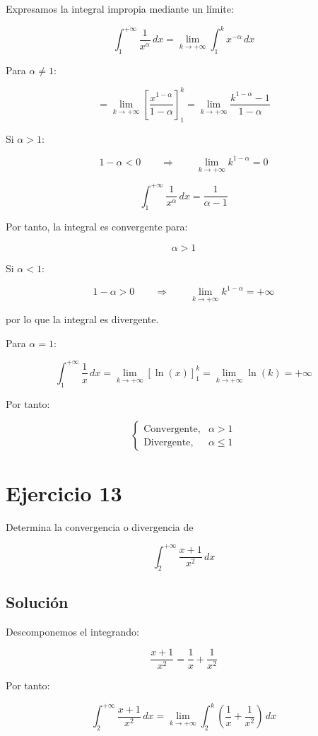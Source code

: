 \documentclass[fleqn]{article}
\begin{document}
	Expresamos la integral impropia mediante un límite:

	\[
	\int_1^{+\infty}\frac{1}{x^\alpha}\,dx
	=
	\lim_{k\to+\infty}
	\int_1^k x^{-\alpha}\,dx
	\]

	Para $\alpha\neq1$:

	\[
	=
	\lim_{k\to+\infty}
	\left[
	\frac{x^{1-\alpha}}{1-\alpha}
	\right]_1^k
	=
	\lim_{k\to+\infty}
	\frac{k^{1-\alpha}-1}{1-\alpha}
	\]

	Si $\alpha>1$:

	\[
	1-\alpha<0
	\qquad\Longrightarrow\qquad
	\lim_{k\to+\infty}k^{1-\alpha}=0
	\]

	\[
	\int_1^{+\infty}\frac{1}{x^\alpha}\,dx
	=
	\frac{1}{\alpha-1}
	\]

	Por tanto, la integral es convergente para:

	\[
	\boxed{\alpha>1}
	\]

	Si $\alpha<1$:

	\[
	1-\alpha>0
	\qquad\Longrightarrow\qquad
	\lim_{k\to+\infty}k^{1-\alpha}=+\infty
	\]

	por lo que la integral es divergente.

	Para $\alpha=1$:

	\[
	\int_1^{+\infty}\frac{1}{x}\,dx
	=
	\lim_{k\to+\infty}
	\left[\ln(x)\right]_1^k
	=
	\lim_{k\to+\infty}\ln(k)
	=
	+\infty
	\]

	Por tanto:

	\[
	\boxed{
	\begin{cases}
	\text{Convergente}, & \alpha>1 \\[2mm]
	\text{Divergente}, & \alpha\leq1
	\end{cases}
	}
	\]

\section{Ejercicio 13}
	Determina la convergencia o divergencia de

	\[
	\int_2^{+\infty}\frac{x+1}{x^2}\,dx
	\]

	\subsection{Solución}

	Descomponemos el integrando:

	\[
	\frac{x+1}{x^2}
	=
	\frac{1}{x}
	+
	\frac{1}{x^2}
	\]

	Por tanto:

	\[
	\int_2^{+\infty}\frac{x+1}{x^2}\,dx
	=
	\lim_{k\to+\infty}
	\int_2^k
	\left(
	\frac{1}{x}+\frac{1}{x^2}
	\right)\,dx
	\]
\end{document}

